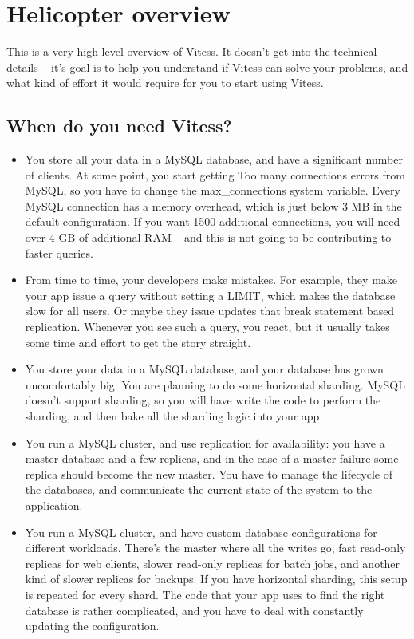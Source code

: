 \section{Helicopter overview}\hypertarget{helicopter-overview}{}\label{helicopter-overview}

This is a very high level overview of Vitess. It doesn’t get into the technical
details – it’s goal is to help you understand if Vitess can solve your problems,
and what kind of effort it would require for you to start using Vitess.

\subsection{When do you need Vitess?}\hypertarget{when-do-you-need-vitess}{}\label{when-do-you-need-vitess}

\begin{itemize}
\item You store all your data in a MySQL database, and have a significant number of
  clients. At some point, you start getting Too many connections errors from
  MySQL, so you have to change the max\_connections system variable. Every MySQL
  connection has a memory overhead, which is just below 3 MB in the default
  configuration. If you want 1500 additional connections, you will need over 4 GB
  of additional RAM – and this is not going to be contributing to faster queries.
\item From time to time, your developers make mistakes. For example, they make your
  app issue a query without setting a LIMIT, which makes the database slow for
  all users. Or maybe they issue updates that break statement based replication.
  Whenever you see such a query, you react, but it usually takes some time and
  effort to get the story straight.
\item You store your data in a MySQL database, and your database has grown
  uncomfortably big. You are planning to do some horizontal sharding. MySQL
  doesn’t support sharding, so you will have write the code to perform the
  sharding, and then bake all the sharding logic into your app.
\item You run a MySQL cluster, and use replication for availability: you have a master
  database and a few replicas, and in the case of a master failure some replica
  should become the new master. You have to manage the lifecycle of the databases,
  and communicate the current state of the system to the application.
\item You run a MySQL cluster, and have custom database configurations for different
  workloads. There’s the master where all the writes go, fast read-only replicas
  for web clients, slower read-only replicas for batch jobs, and another kind of
  slower replicas for backups. If you have horizontal sharding, this setup is
  repeated for every shard. The code that your app uses to find the right
  database is rather complicated, and you have to deal with constantly updating
  the configuration.
\end{itemize}

